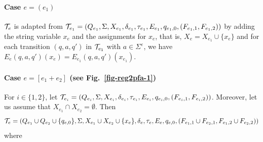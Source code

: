 		
\paragraph{Case $e = (e_1)$} $\mathcal{T}_e$ is adapted from $\mathcal{T}_{e_1} = (Q_{e_1}, \Sigma, X_{e_1}, \delta_{e_1}, \tau_{e_1}, E_{e_1},  q_{e_1,0}, (F_{e_1,1}, F_{e_1,2}))$ by adding the string variable $x_e$ and the assignments for $x_e$, that is, $X_e = X_{e_1} \cup \{x_e\}$ and for each transition $(q, a, q')$ in $\mathcal{T}_{e_1} $ with $a \in \Sigma^\varepsilon$, we have $E_e(q, a, q')(x_e) = E_{e_1}(q, a, q')(x_{e_1})$. 
		

\paragraph{Case $e = [e_1 + e_2]$ (see Fig.~\ref{fig-reg2pfa-1})} For $i \in \{1, 2\}$, let  
$\mathcal{T}_{e_i} = (Q_{e_i}, \Sigma, X_{e_i}, \delta_{e_i}, \tau_{e_i}, E_{e_i},  q_{e_i,0}, (F_{e_i,1}, F_{e_i,2}))$. Moreover, let us assume that $X_{e_1} \cap X_{e_2} = \emptyset$.
% 
Then 
\[\mathcal{T}_e = (Q_{e_1} \cup Q_{e_2} \cup \{q_{e,0}\}, \Sigma, X_{e_1} \cup X_{e_2} \cup \{x_e\}, 
		\delta_e, \tau_e, E_e, q_{e,0}, (F_{e_1,1} \cup F_{e_2,1}, F_{e_1,2} \cup F_{e_2,2}))\] where  
